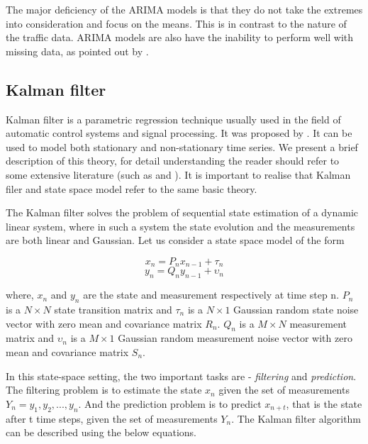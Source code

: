 The major deficiency of the ARIMA models is that they do not take the extremes into
consideration and focus on the means. This is in contrast to the nature of the traffic data.
ARIMA models are also have the inability to perform well with missing data, as pointed out by
\citet{smith1997traffic}.


\subsection{Kalman filter}
Kalman filter is a parametric regression technique usually used in the field of automatic control
systems and signal processing. It was proposed by \citet{kalman1960new}. It can be used to model
both stationary and non-stationary time series. We present a brief description of this theory, for
detail understanding the reader should refer to some extensive literature (such as
\citet{harvey1990forecasting}  and \citet{haykin2001kalman}). It is important to realise that Kalman
filer and state space model refer to the same basic theory.


The Kalman filter solves the problem of sequential state estimation of a dynamic linear system, where
in such a system the state evolution and the measurements are both linear and Gaussian. Let us consider
a state space model of the form

        \begin{equation} x_{n} = P_{n}x_{n-1} + \tau_{n} \end{equation}
        \begin{equation} y_{n} = Q_{n}y_{n-1} + \upsilon_{n} \end{equation}

where, $x_{n}$ and $y_{n}$ are the state and measurement respectively at time step n.
$P_{n}$ is a $N \times N$ state transition matrix and $\tau_{n}$ is a $N \times 1$ Gaussian
random state noise vector with zero mean and covariance matrix $R_{n}$. $Q_{n}$ is a $M \times N$
measurement matrix and $\upsilon_{n}$ is a $M \times 1$ Gaussian random measurement noise vector
with zero mean and covariance matrix $S_{n}$.

In this state-space setting, the two important tasks are - \textit{filtering} and \textit{prediction}.
The filtering problem is to estimate the state $x_{n}$ given the set of measurements
$Y_{n} = y_{1}, y_{2},...,y_{n}$. And the prediction problem is to predict $x_{n+t}$, that is the
state after t time steps, given the set of measurements $Y_{n}$. The Kalman filter algorithm can be
described using the below equations.

